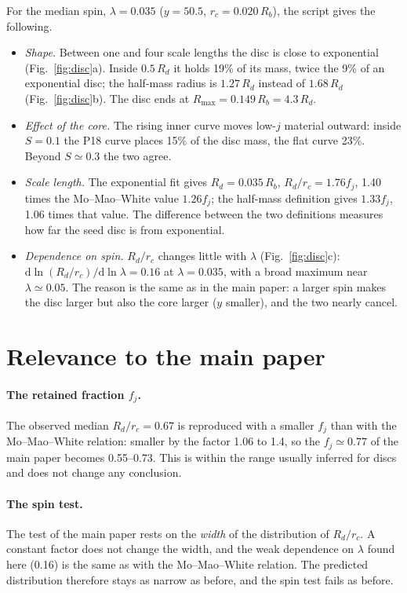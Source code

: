 \documentclass[11pt,a4paper]{article}
\newcommand{\dd}{\mathrm{d}}
\newcommand{\rc}{r_c}
\newcommand{\Rb}{R_b}
\newcommand{\Rmax}{R_{\max}}
\begin{document}
For the median spin, $\lambda=0.035$ ($y=50.5$, $\rc=0.020\,\Rb$), the
script gives the following.
\begin{itemize}
\item \emph{Shape.} Between one and four scale lengths the disc is close
  to exponential (Fig.~\ref{fig:disc}a). Inside $0.5\,R_d$ it holds 19\%
  of its mass, twice the 9\% of an exponential disc; the half-mass radius
  is $1.27\,R_d$ instead of $1.68\,R_d$ (Fig.~\ref{fig:disc}b). The disc
  ends at $\Rmax=0.149\,\Rb=4.3\,R_d$.
\item \emph{Effect of the core.} The rising inner curve moves low-$j$
  material outward: inside $S=0.1$ the P18 curve places 15\% of the disc
  mass, the flat curve 23\%. Beyond $S\simeq0.3$ the two agree.
\item \emph{Scale length.} The exponential fit gives
  $R_d=0.035\,\Rb$, $R_d/\rc=1.76f_j$, 1.40 times the Mo--Mao--White
  value $1.26f_j$; the half-mass definition gives $1.33f_j$, 1.06 times
  that value. The difference between the two definitions measures how far
  the seed disc is from exponential.
\item \emph{Dependence on spin.} $R_d/\rc$ changes little with $\lambda$
  (Fig.~\ref{fig:disc}c): $\dd\ln(R_d/\rc)/\dd\ln\lambda=0.16$ at
  $\lambda=0.035$, with a broad maximum near $\lambda\simeq0.05$. The
  reason is the same as in the main paper: a larger spin makes the disc
  larger but also the core larger ($y$ smaller), and the two nearly
  cancel.
\end{itemize}

\section{Relevance to the main paper}

\paragraph{The retained fraction $f_j$.} The observed median
$R_d/\rc=0.67$ is reproduced with a smaller $f_j$ than with the
Mo--Mao--White relation: smaller by the factor 1.06 to 1.4, so the
$f_j\simeq0.77$ of the main paper becomes 0.55--0.73. This is within the
range usually inferred for discs and does not change any conclusion.

\paragraph{The spin test.} The test of the main paper rests on the
\emph{width} of the distribution of $R_d/\rc$. A constant factor does not
change the width, and the weak dependence on $\lambda$ found here (0.16)
is the same as with the Mo--Mao--White relation. The predicted
distribution therefore stays as narrow as before, and the spin test
fails as before.
\end{document}
